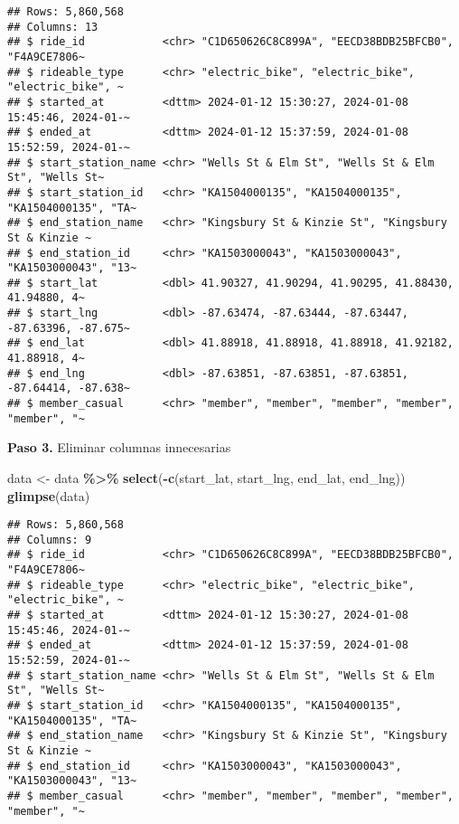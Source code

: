 \documentclass[
]{article}
\newenvironment{Shaded}{\begin{snugshade}}{\end{snugshade}}
\newcommand{\FunctionTok}[1]{\textcolor[rgb]{0.13,0.29,0.53}{\textbf{#1}}}
\newcommand{\NormalTok}[1]{#1}
\newcommand{\OtherTok}[1]{\textcolor[rgb]{0.56,0.35,0.01}{#1}}
\newcommand{\SpecialCharTok}[1]{\textcolor[rgb]{0.81,0.36,0.00}{\textbf{#1}}}
\newcommand{\StringTok}[1]{\textcolor[rgb]{0.31,0.60,0.02}{#1}}
\begin{document}
\begin{verbatim}
## Rows: 5,860,568
## Columns: 13
## $ ride_id            <chr> "C1D650626C8C899A", "EECD38BDB25BFCB0", "F4A9CE7806~
## $ rideable_type      <chr> "electric_bike", "electric_bike", "electric_bike", ~
## $ started_at         <dttm> 2024-01-12 15:30:27, 2024-01-08 15:45:46, 2024-01-~
## $ ended_at           <dttm> 2024-01-12 15:37:59, 2024-01-08 15:52:59, 2024-01-~
## $ start_station_name <chr> "Wells St & Elm St", "Wells St & Elm St", "Wells St~
## $ start_station_id   <chr> "KA1504000135", "KA1504000135", "KA1504000135", "TA~
## $ end_station_name   <chr> "Kingsbury St & Kinzie St", "Kingsbury St & Kinzie ~
## $ end_station_id     <chr> "KA1503000043", "KA1503000043", "KA1503000043", "13~
## $ start_lat          <dbl> 41.90327, 41.90294, 41.90295, 41.88430, 41.94880, 4~
## $ start_lng          <dbl> -87.63474, -87.63444, -87.63447, -87.63396, -87.675~
## $ end_lat            <dbl> 41.88918, 41.88918, 41.88918, 41.92182, 41.88918, 4~
## $ end_lng            <dbl> -87.63851, -87.63851, -87.63851, -87.64414, -87.638~
## $ member_casual      <chr> "member", "member", "member", "member", "member", "~
\end{verbatim}

\hfill\break
\textbf{Paso 3.} Eliminar columnas innecesarias

\begin{Shaded}
\begin{Highlighting}[]
\NormalTok{data }\OtherTok{\textless{}{-}}\NormalTok{ data }\SpecialCharTok{\%\textgreater{}\%} 
  \FunctionTok{select}\NormalTok{(}\SpecialCharTok{{-}}\FunctionTok{c}\NormalTok{(}\StringTok{\textquotesingle{}start\_lat\textquotesingle{}}\NormalTok{, }\StringTok{\textquotesingle{}start\_lng\textquotesingle{}}\NormalTok{, }\StringTok{\textquotesingle{}end\_lat\textquotesingle{}}\NormalTok{, }\StringTok{\textquotesingle{}end\_lng\textquotesingle{}}\NormalTok{))}
\FunctionTok{glimpse}\NormalTok{(data)}
\end{Highlighting}
\end{Shaded}

\begin{verbatim}
## Rows: 5,860,568
## Columns: 9
## $ ride_id            <chr> "C1D650626C8C899A", "EECD38BDB25BFCB0", "F4A9CE7806~
## $ rideable_type      <chr> "electric_bike", "electric_bike", "electric_bike", ~
## $ started_at         <dttm> 2024-01-12 15:30:27, 2024-01-08 15:45:46, 2024-01-~
## $ ended_at           <dttm> 2024-01-12 15:37:59, 2024-01-08 15:52:59, 2024-01-~
## $ start_station_name <chr> "Wells St & Elm St", "Wells St & Elm St", "Wells St~
## $ start_station_id   <chr> "KA1504000135", "KA1504000135", "KA1504000135", "TA~
## $ end_station_name   <chr> "Kingsbury St & Kinzie St", "Kingsbury St & Kinzie ~
## $ end_station_id     <chr> "KA1503000043", "KA1503000043", "KA1503000043", "13~
## $ member_casual      <chr> "member", "member", "member", "member", "member", "~
\end{verbatim}
\end{document}
